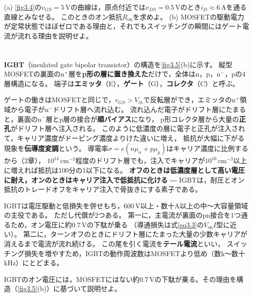 \begin{問}
\item (a) \ref{fig3.4}の$v_{GS} = 5$\,Vの曲線は，原点付近では$v_{DS} = 0.5$\,Vのとき$i_D \approx 6$\,Aを通る直線とみなせる。
このときのオン抵抗$R_{\mathrm{on}}$を求めよ。
(b) MOSFETの駆動電力が定常状態でほぼゼロである理由と，それでもスイッチングの瞬間にはゲート電流が流れる理由を説明せよ。
\end{問}

\section{}
\label{sec3.5}

\textbf{IGBT}（insulated gate bipolar transistor）の構造を\ref{fig3.5}(b)に示す。
縦型MOSFETの裏面のn$^+$層を\textbf{p形の層に置き換えた}だけで，全体はn，p，n$^-$，pの4層構造になる。
端子は\textbf{エミッタ}（E），\textbf{ゲート}（G），\textbf{コレクタ}（C）と呼ぶ。

ゲートの働きはMOSFETと同じで，$v_{GS} > V_{th}$で反転層ができ，エミッタのn$^+$領域から電子がn$^-$ドリフト層へ流れ込む。
流れ込んだ電子がドリフト層にたまると，裏面のn$^-$層とp層の接合が\textbf{順バイアス}になり，
p形コレクタ層から大量の\textbf{正孔}がドリフト層へ注入される。
このように低濃度の層に電子と正孔が注入されて，キャリア濃度がドーピング濃度よりけた違いに増え，
抵抗が大幅に下がる現象を\textbf{伝導度変調}という。
導電率$\sigma = e(n\mu_n + p\mu_p)$はキャリア濃度に比例するから（2章），
$10^{14}\,\mathrm{cm^{-3}}$程度のドリフト層でも，注入でキャリアが$10^{16}\,\mathrm{cm^{-3}}$以上に増えれば抵抗は100分の1以下になる。
\textbf{オフのときは低濃度層として高い電圧に耐え，オンのときはキャリア注入で低抵抗に化ける} ―
IGBTは，耐圧とオン抵抗のトレードオフをキャリア注入で骨抜きにする素子である。

IGBTは電圧駆動と低損失を併せもち，600\,V以上・数十A以上の中〜大容量領域の主役である。
ただし代償が2つある。
第一に，主電流が裏面のpn接合を1つ通るため，オン電圧に約$0.7$\,Vの下駄が乗る
（導通損失は式\ref{eq3.3}の$V_{\mathrm{on}}I$型に近い）。
第二に，ターンオフのときにドリフト層にたまった大量の少数キャリアが消えるまで電流が流れ続ける。
この尾を引く電流を\textbf{テール電流}といい，
スイッチング損失を増やすため，IGBTの動作周波数はMOSFETより低め（数k〜数十kHz）にとどまる。

\begin{問}
\item IGBTのオン電圧には，MOSFETにはない約$0.7$\,Vの下駄が乗る。その理由を構造（\ref{fig3.5}(b)）に基づいて説明せよ。
\end{問}

